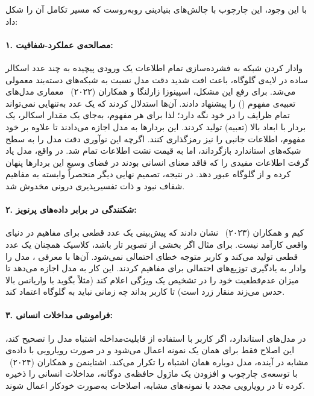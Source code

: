 با این وجود، این چارچوب با چالش‌های بنیادینی روبه‌روست که مسیر تکامل آن را شکل داد:

\paragraph{۱. مصالحه‌ی عملکرد-شفافیت:} وادار کردن شبکه به فشرده‌سازی تمام اطلاعات یک ورودی پیچیده به چند عدد اسکالر ساده در لایه‌ی گلوگاه، باعث افت شدید دقت مدل نسبت به شبکه‌های دسته‌بند معمولی می‌شد. برای رفع این مشکل، اسپینوزا زارلنگا و همکاران (۲۰۲۲)~\cite{zarlenga2022cem} معماری مدل‌های تعبیه‌ی مفهوم () را پیشنهاد دادند. آن‌ها استدلال کردند که یک عدد به‌تنهایی نمی‌تواند تمام ظرایف را در خود نگه دارد؛ لذا برای هر مفهوم، به‌جای یک مقدار اسکالر، یک بردار با ابعاد بالا (تعبیه) تولید کردند. این بردارها به مدل اجازه می‌دادند تا علاوه بر خود مفهوم، اطلاعات جانبی را نیز رمزگذاری کنند. اگرچه این نوآوری دقت مدل را به سطح شبکه‌های استاندارد بازگرداند، اما به قیمت نشت اطلاعات تمام شد. در واقع، مدل یاد گرفت اطلاعات مفیدی را که فاقد معنای انسانی بودند در فضای وسیع این بردارها پنهان کرده و از گلوگاه عبور دهد. در نتیجه، تصمیم نهایی دیگر منحصراً وابسته به مفاهیم شفاف نبود و ذات تفسیرپذیری درونی مخدوش شد.

\paragraph{۲. شکنندگی در برابر داده‌های پرنویز:} کیم و همکاران (۲۰۲۳)~\cite{kim2023probabilistic} نشان دادند که پیش‌بینی یک عدد قطعی برای مفاهیم در دنیای واقعی کارآمد نیست. برای مثال اگر بخشی از تصویر تار باشد،  کلاسیک همچنان یک عدد قطعی تولید می‌کند و کاربر متوجه خطای احتمالی نمی‌شود. آن‌ها با معرفی ، مدل را وادار به یادگیری توزیع‌های احتمالی برای مفاهیم کردند. این کار به مدل اجازه می‌دهد تا میزان عدم‌قطعیت خود را در تشخیص یک ویژگی اعلام کند (مثلاً بگوید با واریانس بالا حدس می‌زند منقار زرد است) تا کاربر بداند چه زمانی نباید به گلوگاه اعتماد کند.

\paragraph{۳. فراموشی مداخلات انسانی:} در مدل‌های استاندارد، اگر کاربر با استفاده از قابلیت‌مداخله اشتباه مدل را تصحیح کند، این اصلاح فقط برای همان یک نمونه اعمال می‌شود و در صورت رویارویی با داده‌ی مشابه در آینده، مدل دوباره همان اشتباه را تکرار می‌کند. اشتاینمن و همکاران (۲۰۲۴)~\cite{steinmann2024learning} با توسعه‌ی چارچوب  و افزودن یک ماژول حافظه‌ی دوگانه، مداخلات انسانی را ذخیره کرده تا در رویارویی مجدد با نمونه‌های مشابه، اصلاحات به‌صورت خودکار اعمال شوند.

